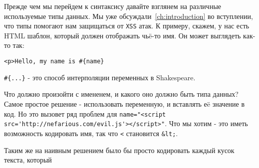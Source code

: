 Прежде чем мы перейдем к синтаксису давайте взглянем на различные используемые 
типы данных. Мы уже обсуждали~\ref{ch:introduction} во вступлении, что типы 
помогают нам защищаться от \texttt{XSS} атак. К примеру, скажем, 
у нас есть HTML шаблон, который должен отображать чьë-то имя. Он может выглядеть
как-то так:

\begin{lstlisting}
<p>Hello, my name is #{name}
\end{lstlisting}


\lstinline'#{...}' - это способ интерполяции переменных в Shakespeare.

Что должно произойти с имененем, и какого оно должно быть типа данных?
Самое простое решение - использовать  переменную, и вставлять 
еë значение в код.  
Но это вызовет ряд проблем для 
\lstinline!name="<script src='http://nefarious.com/evil.js'></script>"!.
Что мы хотим - это иметь возможность кодировать имя, так что 
\lstinline'<' становится \lstinline'&lt;'.

Таким же на наивным решением было бы просто кодировать каждый кусок текста,
который 






